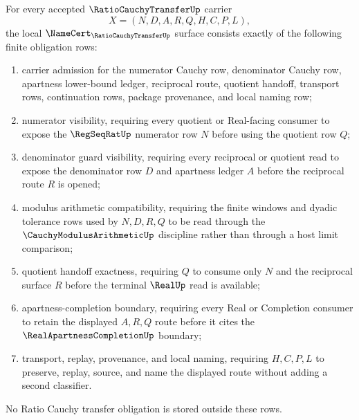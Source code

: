 \begin{theorem}
\label{thm:ratio-cauchy-transfer-namecert-obligations}
For every accepted $\RatioCauchyTransferUp$ carrier
$$
X=(N,D,A,R,Q,H,C,P,L),
$$
the local $\NameCert_{\RatioCauchyTransferUp}$ surface consists exactly of the following finite obligation rows:
\begin{enumerate}
\item carrier admission for the numerator Cauchy row, denominator Cauchy row, apartness lower-bound ledger, reciprocal route, quotient handoff, transport rows, continuation rows, package provenance, and local naming row;
\item numerator visibility, requiring every quotient or Real-facing consumer to expose the $\RegSeqRatUp$ numerator row $N$ before using the quotient row $Q$;
\item denominator guard visibility, requiring every reciprocal or quotient read to expose the denominator row $D$ and apartness ledger $A$ before the reciprocal route $R$ is opened;
\item modulus arithmetic compatibility, requiring the finite windows and dyadic tolerance rows used by $N,D,R,Q$ to be read through the $\CauchyModulusArithmeticUp$ discipline rather than through a host limit comparison;
\item quotient handoff exactness, requiring $Q$ to consume only $N$ and the reciprocal surface $R$ before the terminal $\RealUp$ read is available;
\item apartness-completion boundary, requiring every Real or Completion consumer to retain the displayed $A,R,Q$ route before it cites the $\RealApartnessCompletionUp$ boundary;
\item transport, replay, provenance, and local naming, requiring $H,C,P,L$ to preserve, replay, source, and name the displayed route without adding a second classifier.
\end{enumerate}
No Ratio Cauchy transfer obligation is stored outside these rows.
\end{theorem}
